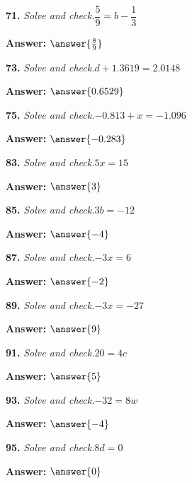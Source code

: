 \documentclass{ximera}
\begin{document}
\begin{problem}
\textbf{71.} \emph{Solve and check.}\quad $\dfrac{5}{9} = b - \dfrac{1}{3}$

\textbf{Answer:} $\answer{\frac{8}{9}}$
\end{problem}

\begin{problem}
\textbf{73.} \emph{Solve and check.}\quad $d + 1.3619 = 2.0148$

\textbf{Answer:} $\answer{0.6529}$
\end{problem}

\begin{problem}
\textbf{75.} \emph{Solve and check.}\quad $-0.813 + x = -1.096$

\textbf{Answer:} $\answer{-0.283}$
\end{problem}

\begin{problem}
\textbf{83.} \emph{Solve and check.}\quad $5x = 15$

\textbf{Answer:} $\answer{3}$
\end{problem}

\begin{problem}
\textbf{85.} \emph{Solve and check.}\quad $3b = -12$

\textbf{Answer:} $\answer{-4}$
\end{problem}

\begin{problem}
\textbf{87.} \emph{Solve and check.}\quad $-3x = 6$

\textbf{Answer:} $\answer{-2}$
\end{problem}

\begin{problem}
\textbf{89.} \emph{Solve and check.}\quad $-3x = -27$

\textbf{Answer:} $\answer{9}$
\end{problem}

\begin{problem}
\textbf{91.} \emph{Solve and check.}\quad $20 = 4c$

\textbf{Answer:} $\answer{5}$
\end{problem}

\begin{problem}
\textbf{93.} \emph{Solve and check.}\quad $-32 = 8w$

\textbf{Answer:} $\answer{-4}$
\end{problem}

\begin{problem}
\textbf{95.} \emph{Solve and check.}\quad $8d = 0$

\textbf{Answer:} $\answer{0}$
\end{problem}
\end{document}
